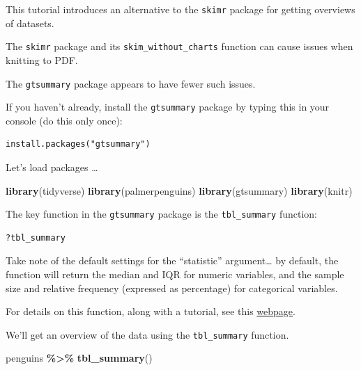 \documentclass[
]{book}
\newenvironment{Shaded}{\begin{snugshade}}{\end{snugshade}}
\newcommand{\FunctionTok}[1]{\textcolor[rgb]{0.13,0.29,0.53}{\textbf{#1}}}
\newcommand{\NormalTok}[1]{#1}
\newcommand{\SpecialCharTok}[1]{\textcolor[rgb]{0.81,0.36,0.00}{\textbf{#1}}}
\begin{document}
This tutorial introduces an alternative to the \texttt{skimr} package for getting overviews of datasets.

The \texttt{skimr} package and its \texttt{skim\_without\_charts} function can cause issues when knitting to PDF.

The \texttt{gtsummary} package appears to have fewer such issues.

If you haven't already, install the \texttt{gtsummary} package by typing this in your console (do this only once):

\begin{verbatim}
install.packages("gtsummary")
\end{verbatim}

Let's load packages \ldots{}

\begin{Shaded}
\begin{Highlighting}[]
\FunctionTok{library}\NormalTok{(tidyverse)}
\FunctionTok{library}\NormalTok{(palmerpenguins)}
\FunctionTok{library}\NormalTok{(gtsummary)}
\FunctionTok{library}\NormalTok{(knitr)}
\end{Highlighting}
\end{Shaded}

The key function in the \texttt{gtsummary} package is the \texttt{tbl\_summary} function:

\begin{verbatim}
?tbl_summary
\end{verbatim}

Take note of the default settings for the ``statistic'' argument\ldots{} by default, the function will return the median and IQR for numeric variables, and the sample size and relative frequency (expressed as percentage) for categorical variables.

For details on this function, along with a tutorial, see this \href{https://cran.r-project.org/web/packages/gtsummary/vignettes/tbl_summary.html}{webpage}.

We'll get an overview of the data using the \texttt{tbl\_summary} function.

\begin{Shaded}
\begin{Highlighting}[]
\NormalTok{penguins }\SpecialCharTok{\%\textgreater{}\%}
  \FunctionTok{tbl\_summary}\NormalTok{()}
\end{Highlighting}
\end{Shaded}
\end{document}
